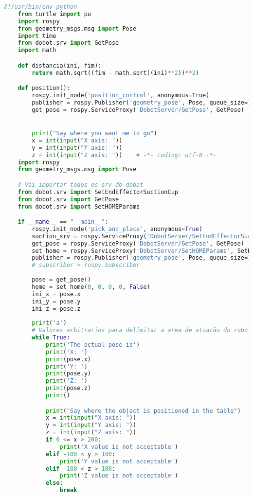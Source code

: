 \begin{lstlisting}[language=Python]
    #!/usr/bin/env python
    from turtle import pu
    import rospy
    from geometry_msgs.msg import Pose
    import time
    from dobot.srv import GetPose
    import math

    def distancia(ini, fim):
        return math.sqrt((fim - math.sqrt((ini)**2))**2)

    def position():
        rospy.init_node('position_control', anonymous=True)
        publisher = rospy.Publisher('geometry_pose', Pose, queue_size=10)
        get_pose = rospy.ServiceProxy('DobotServer/GetPose', GetPose)


        print("Say where you want me to go")
        x = int(input("X axis: "))
        y = int(input("Y axis: "))
        z = int(input("Z axis: "))    # -*- coding: utf-8 -*-
    import rospy
    from geometry_msgs.msg import Pose

    # Vai importar todos os srv do dobot
    from dobot.srv import SetEndEffectorSuctionCup
    from dobot.srv import GetPose
    from dobot.srv import SetHOMEParams

    if __name__ == "__main__":
        rospy.init_node('pick_and_place', anonymous=True)
        suction_srv = rospy.ServiceProxy('DobotServer/SetEndEffectorSuctionCup', SetEndEffectorSuctionCup)
        get_pose = rospy.ServiceProxy('DobotServer/GetPose', GetPose)
        set_home = rospy.ServiceProxy('DobotServer/SetHOMEParams', SetHOMEParams)
        publisher = rospy.Publisher('geometry_pose', Pose, queue_size=10)
        # subscriber = rospy.Subscriber
        
        pose = get_pose()
        home = set_home(0, 0, 0, 0, False)
        ini_x = pose.x
        ini_y = pose.y
        ini_z = pose.z
        
        print('a')
        # Valores arbitrarios para delimitar a area de atuacão do robo
        while True:
            print('The actual pose is')
            print('X: ')
            print(pose.x)
            print('Y: ')
            print(pose.y)
            print('Z: ')
            print(pose.z)
            print()

            print("Say where the object is positioned in the table")
            x = int(input("X axis: "))
            y = int(input("Y axis: "))
            z = int(input("Z axis: "))
            if 0 <= x > 200:
                print('X value is not acceptable')
            elif -100 < y > 100:
                print('Y value is not acceptable')
            elif -100 < z > 100:
                print('Z value is not acceptable')
            else:
                break


\end{lstlisting}
